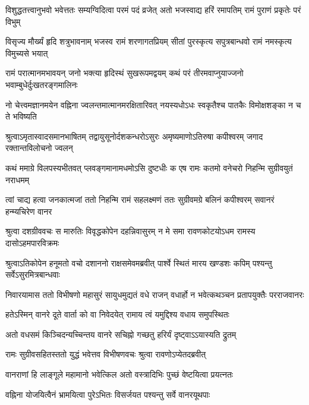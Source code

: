 \fourlineindentedshloka
{विशुद्धतत्त्वानुभवो भवेत्ततः}
{सम्यग्विदित्वा परमं पदं व्रजेत्} %
{अतो भजस्वाद्य हरिं रमापतिम्}
{रामं पुराणं प्रकृतेः परं विभुम्}

\fourlineindentedshloka
{विसृज्य मौर्ख्यं हृदि शत्रुभावनाम्}
{भजस्व रामं शरणागतप्रियम्}
{सीतां पुरस्कृत्य सपुत्रबान्धवो}
{रामं नमस्कृत्य विमुच्यसे भयात्} %

\fourlineindentedshloka
{रामं परात्मानमभावयन् जनो}
{भक्त्या हृदिस्थं सुखरूपमद्वयम्}
{कथं परं तीरमवाप्नुयाज्जनो}
{भवाम्बुधेर्दुःखतरङ्गमालिनः} %

\fourlineindentedshloka
{नो चेत्त्वमज्ञानमयेन वह्निना}
{ज्वलन्तमात्मानमरक्षितारिवत्}
{नयस्यधोऽधः स्वकृतैश्च पातकैः}
{विमोक्षशङ्का न च ते भविष्यति} %

\fourlineindentedshloka
{श्रुत्वाऽमृतास्वादसमानभाषितम्}
{तद्वायुसूनोर्दशकन्धरोऽसुरः}
{अमृष्यमाणोऽतिरुषा कपीश्वरम्}
{जगाद रक्तान्तविलोचनो ज्वलन्} %

\fourlineindentedshloka
{कथं ममाग्रे विलपस्यभीतवत्}
{प्लवङ्गमानामधमोऽसि दुष्टधीः}
{क एष रामः कतमो वनेचरो}
{निहन्मि सुग्रीवयुतं नराधमम्} %

\fourlineindentedshloka
{त्वां चाद्य हत्वा जनकात्मजां ततो}
{निहन्मि रामं सहलक्ष्मणं ततः}
{सुग्रीवमग्रे बलिनं कपीश्वरम्}
{सवानरं हन्म्यचिरेण वानर}


\fourlineindentedshloka
{श्रुत्वा दशग्रीववचः स मारुतिः}
{विवृद्धकोपेन दहन्निवासुरम्} %
{न मे समा रावणकोटयोऽधम}
{रामस्य दासोऽहमपारविक्रमः}

\fourlineindentedshloka
{श्रुत्वाऽतिकोपेन हनूमतो वचो}
{दशाननो राक्षसमेवमब्रवीत्} %
{पार्श्वे स्थितं मारय खण्डशः कपिम्}
{पश्यन्तु सर्वेऽसुरमित्रबान्धवाः}

\fourlineindentedshloka
{निवारयामास ततो विभीषणो}
{महासुरं सायुधमुद्यतं वधे}
{राजन् वधार्हो न भवेत्कथञ्चन}
{प्रतापयुक्तैः परराजवानरः} %

\twolineshloka
{हतेऽस्मिन् वानरे दूते वार्ता को वा निवेदयेत्}
{रामाय त्वं यमुद्दिश्य वधाय समुपस्थितः} %

\twolineshloka
{अतो वधसमं किञ्चिदन्यच्चिन्तय वानरे}
{सचिह्नो गच्छतु हरिर्यं दृष्ट्वाऽऽयास्यति द्रुतम्} %

\twolineshloka
{रामः सुग्रीवसहितस्ततो युद्धं भवेत्तव}
{विभीषणवचः श्रुत्वा रावणोऽप्येतदब्रवीत्} %

\twolineshloka
{वानराणां हि लाङ्गूले महामानो भवेत्किल}
{अतो वस्त्रादिभिः पुच्छं वेष्टयित्वा प्रयत्नतः} %

\twolineshloka
{वह्निना योजयित्वैनं भ्रामयित्वा पुरेऽभितः}
{विसर्जयत पश्यन्तु सर्वे वानरयूथपाः} %

